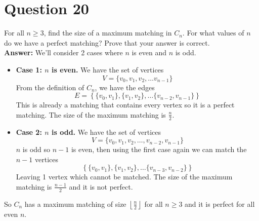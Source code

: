 \documentclass[openany]{report}
\begin{document}
\section{Question 20}
For all $n \geq 3$, find the size of a maximum matching in $C_n$. For what values of $n$ do we have a perfect matching? Prove that your answer is correct.\\[2ex]
\textbf{Answer:} We'll consider 2 cases where $n$ is even and $n$ is odd.
\begin{itemize}
    \item \textbf{Case 1: $n$ is even.} We have the set of vertices 
    \[V = \{v_0, v_1, v_2, \ldots v_{n-1}\}\]
    From the definition of $C_n$, we have the edges 
    \[E = \left\{\{v_0, v_1\}, \{v_1, v_2\}, \ldots \{v_{n-2}, v_{n-1}\}\right\}\]
    This is already a matching that contains every vertex so it is a perfect matching. The size of the maximum matching is $\frac{n}{2}$.
    \item \textbf{Case 2: $n$ is odd.} We have the set of vertices
    \[V = \{v_0, v_1, v_2, \ldots, v_{n-2}, v_{n-1}\}\]
    $n$ is odd so $n-1$ is even, then using the first case again we can match the $n-1$ vertices 
    \[\left\{\{v_0, v_1\}, \{v_1, v_2\}, \ldots \{v_{n-3}, v_{n-2}\}\right\}\]
    Leaving 1 vertex which cannot be matched. The size of the maximum matching is $\frac{n-1}{2}$ and it is not perfect. 
\end{itemize}
So $C_n$ has a maximum matching of size $\left\lfloor\frac{n}{2}\right\rfloor$ for all $n \geq 3$ and it is perfect for all even $n$.
\end{document}
